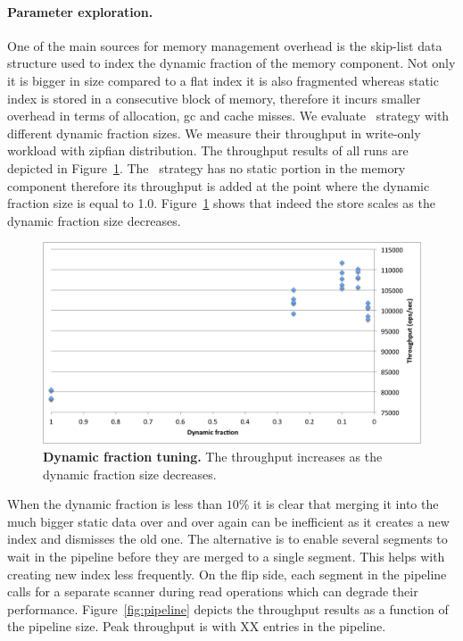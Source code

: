 \paragraph{Parameter exploration.}
One of the main sources for memory management overhead is the skip-list data structure used to index the dynamic fraction of the memory component.
Not only it is bigger in size compared to a flat index it is also fragmented whereas static index is stored in a consecutive block of memory, therefore it incurs smaller overhead in terms of allocation, gc and cache misses.
We evaluate \basic\ strategy with different dynamic fraction sizes. We measure their throughput in write-only workload with zipfian distribution.
The throughput results of all runs are depicted in  Figure~\ref{fig:dynamic-fraction}. 
The \none\ strategy has no static portion in the memory component therefore its throughput is added at the point where the dynamic fraction size is equal to 1.0.
Figure~\ref{fig:dynamic-fraction} shows that indeed the store scales as the dynamic fraction size decreases. 

\begin{figure}[htb]
\includegraphics[width=\figw]{Figs/dynamic-fraction-1.png}
\caption{{\bf Dynamic fraction tuning.} The throughput increases as the dynamic fraction size decreases.
}
\label{fig:dynamic-fraction}
\end{figure}

When the dynamic fraction is less than $10\%$ it is clear that merging it into the much bigger static data over and over again can be inefficient as it creates a new index and dismisses the old one. 
The alternative is to enable several segments to wait in the pipeline before they are merged to a single segment. This helps with creating new index less frequently.
On the flip side, each segment in the pipeline calls for a separate scanner during read operations which can degrade their performance.
Figure~\ref{fig:pipeline} depicts the throughput results as a function of the pipeline size. Peak throughput is with XX entries in the pipeline.

